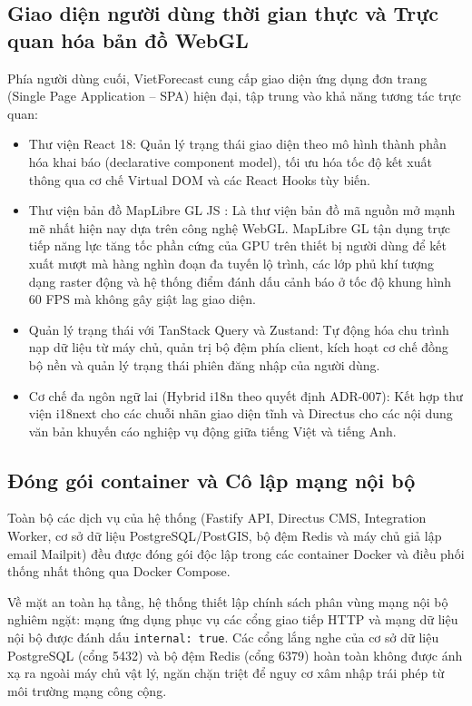 \subsection{Giao diện người dùng thời gian thực và Trực quan hóa bản đồ WebGL}

Phía người dùng cuối, VietForecast cung cấp giao diện ứng dụng đơn trang (Single Page Application -- SPA) hiện đại, tập trung vào khả năng tương tác trực quan:
\begin{itemize}
    \item[-] Thư viện React 18: Quản lý trạng thái giao diện theo mô hình thành phần hóa khai báo (declarative component model), tối ưu hóa tốc độ kết xuất thông qua cơ chế Virtual DOM và các React Hooks tùy biến.
    \item[-] Thư viện bản đồ MapLibre GL JS \cite{maplibre2024}: Là thư viện bản đồ mã nguồn mở mạnh mẽ nhất hiện nay dựa trên công nghệ WebGL. MapLibre GL tận dụng trực tiếp năng lực tăng tốc phần cứng của GPU trên thiết bị người dùng để kết xuất mượt mà hàng nghìn đoạn đa tuyến lộ trình, các lớp phủ khí tượng dạng raster động và hệ thống điểm đánh dấu cảnh báo ở tốc độ khung hình 60 FPS mà không gây giật lag giao diện.
    \item[-] Quản lý trạng thái với TanStack Query và Zustand: Tự động hóa chu trình nạp dữ liệu từ máy chủ, quản trị bộ đệm phía client, kích hoạt cơ chế đồng bộ nền và quản lý trạng thái phiên đăng nhập của người dùng.
    \item[-] Cơ chế đa ngôn ngữ lai (Hybrid i18n theo quyết định ADR-007): Kết hợp thư viện i18next cho các chuỗi nhãn giao diện tĩnh và Directus cho các nội dung văn bản khuyến cáo nghiệp vụ động giữa tiếng Việt và tiếng Anh.
\end{itemize}

\subsection{Đóng gói container và Cô lập mạng nội bộ}

Toàn bộ các dịch vụ của hệ thống (Fastify API, Directus CMS, Integration Worker, cơ sở dữ liệu PostgreSQL/PostGIS, bộ đệm Redis và máy chủ giả lập email Mailpit) đều được đóng gói độc lập trong các container Docker và điều phối thống nhất thông qua Docker Compose.

Về mặt an toàn hạ tầng, hệ thống thiết lập chính sách phân vùng mạng nội bộ nghiêm ngặt: mạng ứng dụng phục vụ các cổng giao tiếp HTTP và mạng dữ liệu nội bộ được đánh dấu \texttt{internal: true}. Các cổng lắng nghe của cơ sở dữ liệu PostgreSQL (cổng 5432) và bộ đệm Redis (cổng 6379) hoàn toàn không được ánh xạ ra ngoài máy chủ vật lý, ngăn chặn triệt để nguy cơ xâm nhập trái phép từ môi trường mạng công cộng.

